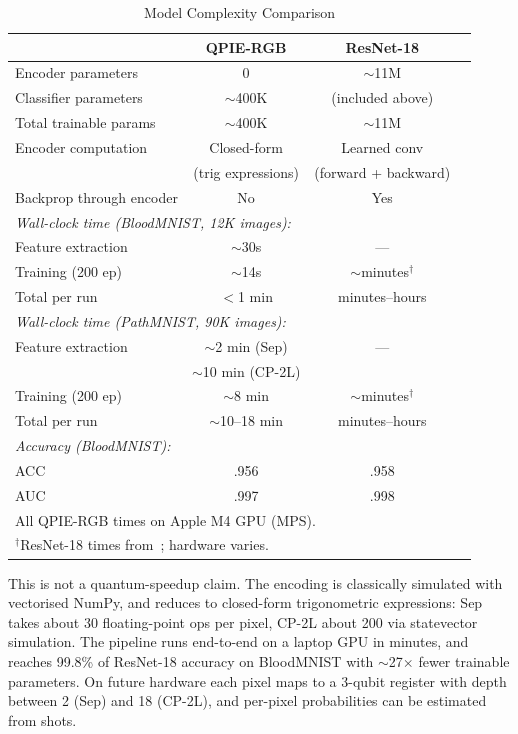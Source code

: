 \documentclass[conference,compsoc]{IEEEtran}
\begin{document}
\begin{table}[t]
\renewcommand{\arraystretch}{1.15}
\caption{Model Complexity Comparison}
\label{tab:complexity}
\centering
\begin{tabular}{lccc}
\toprule
 & \textbf{QPIE-RGB} & \textbf{ResNet-18} \\
\midrule
Encoder parameters & 0 & $\sim$11M \\
Classifier parameters & $\sim$400K & (included above) \\
Total trainable params & $\sim$400K & $\sim$11M \\
\midrule
Encoder computation & Closed-form & Learned conv \\
 & (trig expressions) & (forward + backward) \\
Backprop through encoder & No & Yes \\
\midrule
\multicolumn{3}{l}{\textit{Wall-clock time (BloodMNIST, 12K images):}} \\
\quad Feature extraction & $\sim$30s & --- \\
\quad Training (200 ep) & $\sim$14s & $\sim$minutes$^\dagger$ \\
\quad Total per run & $<$1 min & minutes--hours \\
\midrule
\multicolumn{3}{l}{\textit{Wall-clock time (PathMNIST, 90K images):}} \\
\quad Feature extraction & $\sim$2 min (Sep) & --- \\
 & $\sim$10 min (CP-2L) & \\
\quad Training (200 ep) & $\sim$8 min & $\sim$minutes$^\dagger$ \\
\quad Total per run & $\sim$10--18 min & minutes--hours \\
\midrule
\multicolumn{3}{l}{\textit{Accuracy (BloodMNIST):}} \\
\quad ACC & .956 & .958 \\
\quad AUC & .997 & .998 \\
\bottomrule
\multicolumn{3}{l}{\footnotesize All QPIE-RGB times on Apple M4 GPU (MPS).} \\
\multicolumn{3}{l}{\footnotesize $^\dagger$ResNet-18 times from~\cite{yang2023medmnist}; hardware varies.}
\end{tabular}
\end{table}

This is not a quantum-speedup claim. The encoding is classically simulated with vectorised NumPy, and reduces to closed-form trigonometric expressions: Sep takes about 30 floating-point ops per pixel, CP-2L about 200 via statevector simulation. The pipeline runs end-to-end on a laptop GPU in minutes, and reaches 99.8\% of ResNet-18 accuracy on BloodMNIST with $\sim$27$\times$ fewer trainable parameters. On future hardware each pixel maps to a 3-qubit register with depth between 2 (Sep) and 18 (CP-2L), and per-pixel probabilities can be estimated from shots.
\end{document}
